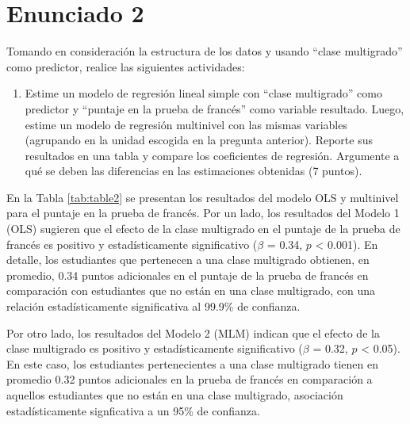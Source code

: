 \documentclass[
  12pt,
  a4paper,
]{article}
\providecommand{\tightlist}{%
  \setlength{\itemsep}{0pt}\setlength{\parskip}{0pt}}
\begin{document}
\hypertarget{enunciado-2}{%
\section{Enunciado 2}\label{enunciado-2}}

Tomando en consideración la estructura de los datos y usando ``clase multigrado'' como predictor, realice las siguientes actividades:

\begin{enumerate}
\def\labelenumi{\alph{enumi})}
\tightlist
\item
  Estime un modelo de regresión lineal simple con ``clase multigrado'' como predictor y ``puntaje en la prueba de francés'' como variable resultado. Luego, estime un modelo de regresión multinivel con las mismas variables (agrupando en la unidad escogida en la pregunta anterior). Reporte sus resultados en una tabla y compare los coeficientes de regresión. Argumente a qué se deben las diferencias en las estimaciones obtenidas (7 puntos).
\end{enumerate}

En la Tabla \ref{tab:table2} se presentan los resultados del modelo OLS y multinivel para el puntaje en la prueba de francés. Por un lado, los resultados del Modelo 1 (OLS) sugieren que el efecto de la clase multigrado en el puntaje de la prueba de francés es positivo y estadísticamente significativo (\(\beta\) = 0.34, \(p\) \textless{} 0.001). En detalle, los estudiantes que pertenecen a una clase multigrado obtienen, en promedio, 0.34 puntos adicionales en el puntaje de la prueba de francés en comparación con estudiantes que no están en una clase multigrado, con una relación estadísticamente significativa al 99.9\% de confianza.

Por otro lado, los resultados del Modelo 2 (MLM) indican que el efecto de la clase multigrado es positivo y estadísticamente significativo (\(\beta\) = 0.32, \(p\) \textless{} 0.05). En este caso, los estudiantes pertenecientes a una clase multigrado tienen en promedio 0.32 puntos adicionales en la prueba de francés en comparación a aquellos estudiantes que no están en una clase multigrado, asociación estadísticamente signficativa a un 95\% de confianza.
\end{document}
